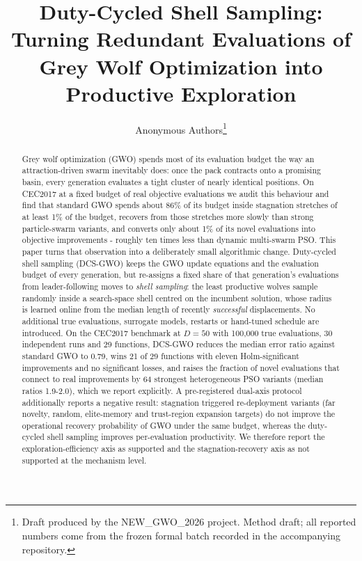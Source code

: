 \documentclass[journal]{IEEEtran}
\newcommand{\method}{DCS-GWO}
\begin{document}
\title{Duty-Cycled Shell Sampling: Turning Redundant Evaluations of Grey Wolf
Optimization into Productive Exploration}

\author{Anonymous Authors\thanks{Draft produced by the NEW\_GWO\_2026
project. Method draft; all reported numbers come from the frozen formal batch recorded in the accompanying repository.}}

\maketitle

\begin{abstract}
Grey wolf optimization (GWO) spends most of its evaluation budget the way an
attraction-driven swarm inevitably does: once the pack contracts onto a
promising basin, every generation evaluates a tight cluster of nearly
identical positions. On CEC2017 at a fixed budget of real objective
evaluations we audit this behaviour and find that standard GWO spends
about 86\% of its budget inside stagnation stretches of at least 1\% of the
budget, recovers from those stretches more slowly than strong particle-swarm
variants, and converts only about 1\% of its novel evaluations into objective
improvements - roughly ten times less than dynamic multi-swarm PSO. This
paper turns that observation into a deliberately small algorithmic change.
Duty-cycled shell sampling (\method) keeps the GWO update equations and the
evaluation budget of every generation, but re-assigns a fixed share of that
generation's evaluations from leader-following moves to \emph{shell
sampling}: the least productive wolves sample randomly inside a
search-space shell centred on the incumbent solution, whose radius is learned
online from the median length of recently \emph{successful} displacements. No
additional true evaluations, surrogate models, restarts or hand-tuned
schedule are introduced. On the CEC2017 benchmark at $D=50$ with
100{,}000 true evaluations, 30 independent runs and 29 functions, \method{}
reduces the median error ratio against standard GWO to 0.79, wins 21 of 29
functions with eleven Holm-significant improvements and no significant
losses, and raises the fraction of novel evaluations that connect to real
improvements by 64%
strongest heterogeneous PSO variants (median ratios 1.9-2.0), which we
report explicitly. A pre-registered
dual-axis protocol additionally reports a negative result: stagnation
triggered re-deployment variants (far novelty, random, elite-memory and
trust-region expansion targets) do not improve the operational recovery
probability of GWO under the same budget, whereas the duty-cycled shell
sampling improves per-evaluation productivity. We therefore report the
exploration-efficiency axis as supported and the stagnation-recovery axis as
not supported at the mechanism level.
\end{abstract}
\end{document}
